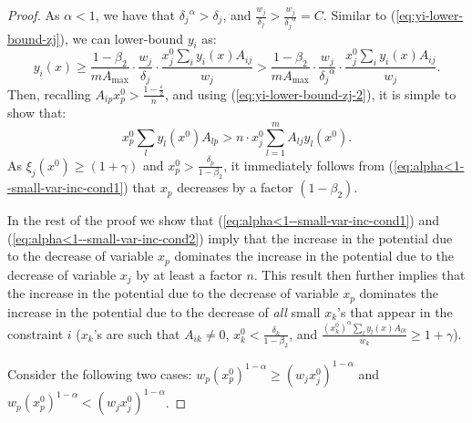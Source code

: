 \documentclass[11pt]{article}
\begin{document}
\begin{proof}
As $\alpha<1$, we have that ${\delta_j}^{\alpha}>\delta_j$, and $\frac{w_j}{\delta_j}>\frac{w_j}{{\delta_j}^\alpha}=C$. Similar to (\ref{eq:yi-lower-bound-zj}), we can lower-bound $y_i$ as:
\begin{equation}
y_i(x) \geq \frac{1-\beta_2}{mA_{\max}}\cdot\frac{w_j}{\delta_j}\cdot\frac{x_j^0\sum_i y_i(x)A_{ij}}{w_j} > \frac{1-\beta_2}{mA_{\max}}\cdot\frac{w_j}{{\delta_j}^{\alpha}}\cdot\frac{x_j^0\sum_i y_i(x)A_{ij}}{w_j}.\label{eq:yi-lower-bound-zj-2}
\end{equation}
Then, recalling $A_{ip}x_p^0 > \frac{1-\frac{\varepsilon}{2}}{n}$, and using (\ref{eq:yi-lower-bound-zj-2}), it is simple to show that:
\begin{equation}
x_p^0\sum_l y_l(x^0)A_{lp} >  n\cdot x_j^0\sum_{l=1}^mA_{lj}y_l(x^0). \label{eq:alpha<1--small-var-inc-cond2}
\end{equation}
As $\xi_j(x^0) \geq (1+\gamma)$ and $x_p^0 > \frac{\delta_p}{1-\beta_2}$, it immediately follows from (\ref{eq:alpha<1--small-var-inc-cond1}) that $x_p$ decreases by a factor $(1-\beta_2)$. 

In the rest of the proof we show that (\ref{eq:alpha<1--small-var-inc-cond1}) and (\ref{eq:alpha<1--small-var-inc-cond2}) imply that the increase in the potential due to the decrease of variable $x_p$ dominates the increase in the potential due to the decrease of variable $x_j$ by at least a factor $n$. This result then further implies that the increase in the potential due to the decrease of variable $x_p$ dominates the increase in the potential due to the decrease of \emph{all} small $x_k$'s that appear in the constraint $i$ ($x_k$'s are such that $A_{ik}\neq 0$, $x_k^0 < \frac{\delta_k}{1-\beta_2}$, and $\frac{(x_k^0)^{\alpha}\sum_l y_l(x)A_{lk}}{w_k}\geq 1+\gamma$).   

Consider the following two cases: $w_p (x_p^0)^{1-\alpha} \geq (w_j x_j^0)^{1-\alpha}$ and $w_p (x_p^0)^{1-\alpha} < (w_j x_j^0)^{1-\alpha}$.


\end{proof}
\end{document}
